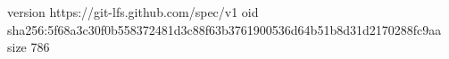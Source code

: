 version https://git-lfs.github.com/spec/v1
oid sha256:5f68a3c30f0b558372481d3c88f63b3761900536d64b51b8d31d2170288fc9aa
size 786
